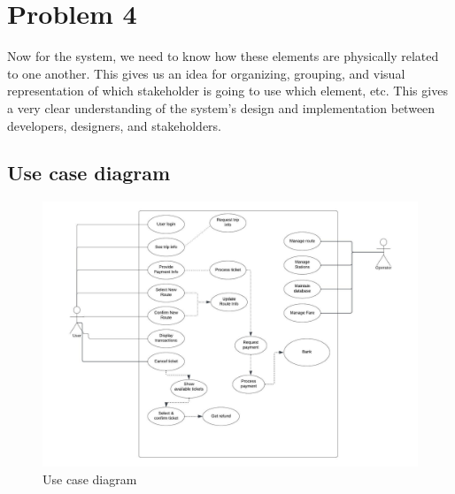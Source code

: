 \documentclass{article}
\begin{document}
 \section{Problem 4}
 Now for the system, we need to know how these elements are physically related to one another. This gives us an idea for organizing, grouping, and visual representation of which stakeholder is going to use which element, etc. This gives a very clear understanding of the system's design and implementation between developers, designers, and stakeholders. 
 \subsection{Use case diagram}
 \begin{figure}[h]
    \centering
    \includegraphics[scale=0.7]{use case.jpeg}
    \caption{Use case diagram}
    \label{fig:useCase}
\end{figure}
\pagebreak
\end{document}
